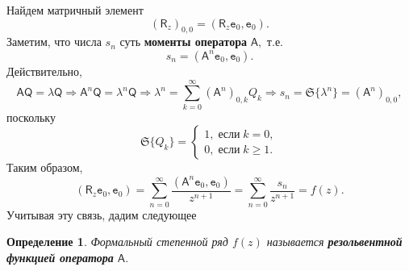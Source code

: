 \documentclass[12 pt, a4 paper]{article}
\theoremstyle{plain}   \newtheorem{Pro}{Задача}
\newtheorem{Def}{Определение}
\begin{document}
Найдем матричный элемент
$$
  (\mathsf{R}_z )_{0,0} =
  (\mathsf{R}_z \mathtt{e}_0 , \mathtt{e}_0 ).
$$
Заметим, что числа
$ s_n $
суть
{\bfseries моменты оператора}
$ \mathsf{A} , $
т.е.
$$
  s_n =(\mathsf{A}^n \mathtt{e}_0 , \mathtt{e}_0 ).
$$
Действительно,
$$
  \mathsf{A} \mathsf{Q}=\lambda \mathsf{Q} \Rightarrow
  \mathsf{A}^n \mathsf{Q} =\lambda ^n \mathsf{Q} \Rightarrow
  \lambda ^n = \sum _{k=0}^{\infty}
  ( \mathsf{A}^n )_{0,k} Q_k \Rightarrow
  s_n =\mathfrak{S} \{ \lambda ^n \} =
  (\mathsf{A} ^n )_{0,0},
$$
поскольку
\begin{equation*}
  \mathfrak{S} \{ Q_k \} =
    \begin{cases}
	  1, \; если \; k=0,\\
	  0, \; если \; k \geq 1.
	\end{cases}
\end{equation*}
Таким образом,
$$
  (\mathsf{R}_z \mathtt{e}_0 , \mathtt{e}_0 )=
  \sum _{n=0}^{\infty} \frac
  {( \mathsf{A}^n \mathtt{e}_0 , \mathtt{e}_0 )}
  {z^{n+1}}=
  \sum _{n=0}^{\infty}
  \frac{s_n}{z^{n+1}}=f(z).
$$
Учитывая эту связь, дадим следующее
\begin{Def}
Формальный степенной ряд
$ f(z) $
называется
{\bfseries резольвентной функцией оператора}
$ \mathsf{A}. $
\end{Def}
$ \; $
\\
\end{document}

